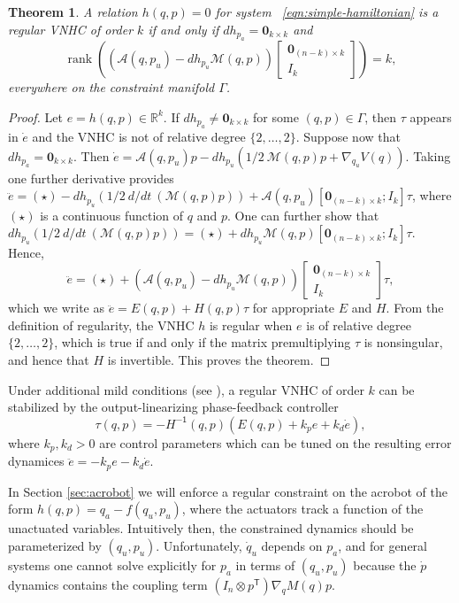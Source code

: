 \documentclass[journal,twoside,web]{ieeecolor}
\newtheorem{thm}{Theorem}%
\DeclareMathOperator{\Rank}{rank}
\newcommand*{\rank}[1]{\Rank\left(#1\right)}
\newcommand*{\tpose}{^\mathsf{T}}
\newcommand*{\inv}{^\mathsf{-1}}
\newcommand*{\R}{\mathbb{R}}
\newcommand*{\Id}[1]{I_{#1}}
\newcommand*{\Zmat}[1]{\bm{0}_{#1}}
\newcommand*{\simpleB}{\begin{bmatrix}\Zmat{(n-k)\times k}\\ \Id{k}\end{bmatrix}}
\begin{document}
\begin{thm}\label{thm:vnhc-regularity}
    A relation \(h(q,p) = 0\) for system ~\eqref{eqn:simple-hamiltonian}
    is a regular VNHC of order \(k\) if and only if 
    \(dh_{p_a} = \Zmat{k \times k}\) 
    and
    \[
        \rank{\left(\mathcal{A}(q,p_u) - dh_{p_u}\mathcal{M}(q,p)\right)\simpleB} = k
         ,
    \]
    everywhere on the constraint manifold \(\Gamma\).
\end{thm}
\begin{proof}
    Let \(e = h(q,p) \in \R^k\).
    If \(dh_{p_a} \neq \Zmat{k\times k}\) for some \((q,p) \in \Gamma\), 
    then \(\tau\) appears in \(\dot{e}\) and the VNHC is not of relative degree
    \(\{2,\ldots,2\}\). Suppose now that \(dh_{p_a} = \Zmat{k\times k}\).
    Then 
    \(\dot{e} = \mathcal{A}(q,p_u)p - 
     dh_{p_u}\left(1/2~\mathcal{M}(q,p)p + \nabla_{q_u}V(q)\right)\).
    Taking one further derivative provides
    \( \ddot{e} = (\star) - 
        dh_{p_u}\left(1/2~d/dt~\left(\mathcal{M}(q,p)p\right)\right) 
        + \mathcal{A}(q,p_u)[\Zmat{(n-k)\times k};\Id{k}] \tau\),
    where \((\star)\) is a continuous function of \(q\) and \(p\).
    One can further show that
    \(dh_{p_u}\left(1/2~d/dt~\left(\mathcal{M}(q,p)p\right)\right)
        = (\star) + dh_{p_u}\mathcal{M}(q,p)[\Zmat{(n-k)\times k};
        \Id{k}]\tau\).
    Hence,
    \[
       \ddot{e} = (\star) +
       \left(\mathcal{A}(q,p_u) - dh_{p_u}\mathcal{M}(q,p)\right) \simpleB \tau
        ,
    \]
    which we write as \( \ddot{e} = E(q,p) + H(q,p)\tau\) for appropriate \(E\)
    and \(H\).
    From the definition of regularity, the VNHC \(h\) is regular 
    when \(e\) is of relative degree \(\{2,\ldots,2\}\), which is true 
    if and only if the matrix premultiplying \(\tau\) is nonsingular, and hence
    that \(H\) is invertible. This proves the theorem.
\end{proof}

Under additional mild conditions (see \cite{vhcs_for_el_systems}), a regular VNHC of
order \(k\) can be stabilized by the output-linearizing phase-feedback
controller
\begin{equation}
    \tau(q,p) = -H\inv(q,p)\left(E(q,p) + k_p e + k_d \dot{e}\right)
    ,
\end{equation}
where \(k_p, k_d > 0\) are control parameters which can be tuned on the
resulting error dynamices \(\ddot{e} = -k_p e - k_d \dot{e}\).

In Section \ref{sec:acrobot} we will enforce a regular constraint on the
acrobot of the form \(h(q,p) = q_a - f(q_u,p_u)\), where the actuators track a
function of the unactuated variables.
Intuitively then, the constrained dynamics should be parameterized by \((q_u, p_u)\).
Unfortunately, \(\dot{q}_u\) depends on \(p_a\), and for general systems one
cannot solve explicitly for \(p_a\) in terms of \((q_u,p_u)\) because
the \(\dot{p}\) dynamics contains the coupling term 
\((\Id{n} \otimes p\tpose)\nabla_{q}M(q)p\). 
\end{document}
